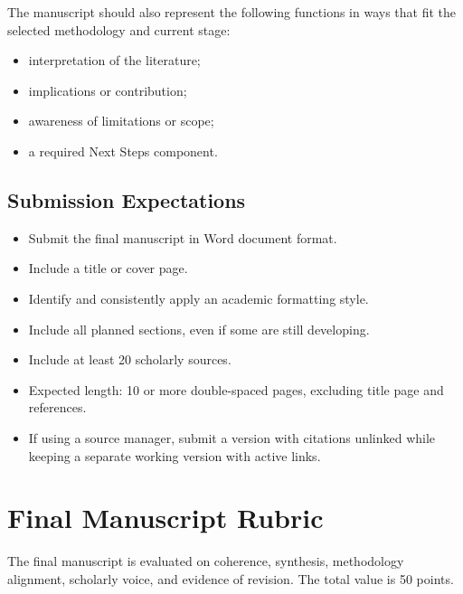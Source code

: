 \documentclass[11pt]{article}
\begin{document}
The manuscript should also represent the following functions in ways that fit the selected methodology and current stage:

\begin{itemize}
  \item interpretation of the literature;
  \item implications or contribution;
  \item awareness of limitations or scope;
  \item a required Next Steps component.
\end{itemize}

\subsection{Submission Expectations}

\begin{itemize}
  \item Submit the final manuscript in Word document format.
  \item Include a title or cover page.
  \item Identify and consistently apply an academic formatting style.
  \item Include all planned sections, even if some are still developing.
  \item Include at least 20 scholarly sources.
  \item Expected length: 10 or more double-spaced pages, excluding title page and references.
  \item If using a source manager, submit a version with citations unlinked while keeping a separate working version with active links.
\end{itemize}

\section{Final Manuscript Rubric}

The final manuscript is evaluated on coherence, synthesis, methodology alignment, scholarly voice, and evidence of revision. The total value is 50 points.
\end{document}
